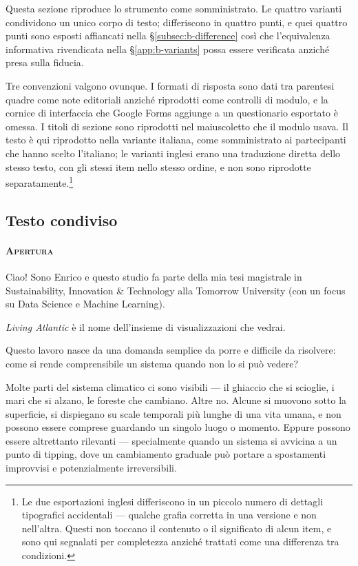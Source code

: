 Questa sezione riproduce lo strumento come somministrato. Le quattro varianti condividono un
unico corpo di testo; differiscono in quattro punti, e quei quattro punti sono esposti affiancati
nella \S\ref{subsec:b-difference} così che l'equivalenza informativa rivendicata nella
\S\ref{app:b-variants} possa essere verificata anziché presa sulla fiducia.

Tre convenzioni valgono ovunque. I formati di risposta sono dati tra parentesi quadre come note
editoriali anziché riprodotti come controlli di modulo, e la cornice di interfaccia che Google
Forms aggiunge a un questionario esportato è omessa. I titoli di sezione sono riprodotti nel
maiuscoletto che il modulo usava. Il testo è qui riprodotto nella variante italiana, come
somministrato ai partecipanti che hanno scelto l'italiano; le varianti inglesi erano una
traduzione diretta dello stesso testo, con gli stessi item nello stesso ordine, e non sono
riprodotte separatamente.\footnote{Le due esportazioni inglesi differiscono in un piccolo numero
di dettagli tipografici accidentali --- qualche grafia corretta in una versione e non nell'altra.
Questi non toccano il contenuto o il significato di alcun item, e sono qui segnalati per
completezza anziché trattati come una differenza tra condizioni.}

\subsection{Testo condiviso}
\label{subsec:b-shared}

\small

\paragraph{\textsc{Apertura}}
Ciao! Sono Enrico e questo studio fa parte della mia tesi magistrale in Sustainability, Innovation \&
Technology alla Tomorrow University (con un focus su Data Science e Machine Learning).

\emph{Living Atlantic} è il nome dell'insieme di visualizzazioni che vedrai.

Questo lavoro nasce da una domanda semplice da porre e difficile da risolvere: come si rende
comprensibile un sistema quando non lo si può vedere?

Molte parti del sistema climatico ci sono visibili --- il ghiaccio che si scioglie, i mari che si
alzano, le foreste che cambiano. Altre no. Alcune si muovono sotto la superficie, si dispiegano su
scale temporali più lunghe di una vita umana, e non possono essere comprese guardando un singolo
luogo o momento. Eppure possono essere altrettanto rilevanti --- specialmente quando un sistema si
avvicina a un punto di tipping, dove un cambiamento graduale può portare a spostamenti improvvisi e
potenzialmente irreversibili.

